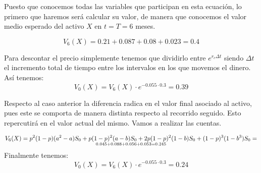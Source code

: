 \begin{problem}[1]
Puesto que conocemos todas las variables que participan en esta ecuación, lo primero que haremos será calcular su valor, de manera que conocemos el valor medio esperado del activo $X$ en $t=T=6$ meses.

\[V_6(X) = 0.21+0.087+0.08+0.023 = 0.4\]

Para descontar el precio simplemente tenemos que dividirlo entre $e^{r_cΔt}$ siendo $Δt$ el incremento total de tiempo entre los intervalos en los que movemos el dinero. Así tenemos:
\[V_0(X) = V_6(X)\cdot e^{-0.055\cdot 0.3}=0.39\]

\spart

Respecto al caso anterior la diferencia radica en el valor final asociado al activo, pues este se comporta de manera distinta respecto al recorrido seguido. Esto repercutirá en el valor actual del mismo. Vamos a realizar las cuentas.

\[V_6(X) = p^2(1-p)(a^2-a)S_0+p(1-p)^2(a-b)S_0+2p(1-p)^2(1-b)S_0+(1-p)^3(1-b^3)S_0=\atop 0.045 + 0.088 + 0.056 + 0.053 = 0.245\]
Finalmente tenemos:
\[V_0(X) = V_6(X)\cdot e^{-0.055\cdot 0.3} = 0.24\]
\end{problem}

